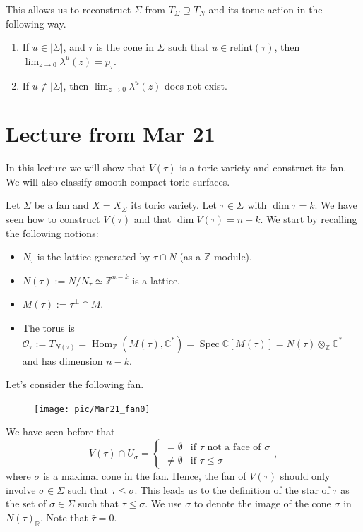 \documentclass[a4paper,12pt]{amsart}
\newcommand{\ZZ}{\mathbb{Z}}
\newcommand{\RR}{\mathbb{R}}
\newcommand{\CC}{\mathbb{C}}
\newcommand{\OO}{\ensuremath{\mathcal{O}}}
\DeclareMathOperator{\Hom}{Hom}
\DeclareMathOperator{\Spec}{Spec}
\begin{document}
This allows us to reconstruct $\Sigma$ from $T_\Sigma\supseteq T_N$ and its toruc action in the following way.
\begin{enumerate}[(1)]
	\item If $u\in|\Sigma|$, and $\tau$ is the cone in $\Sigma$ such that $u\in\text{relint}(\tau)$, then $\lim_{z\rightarrow0}\lambda^u(z)=p_\tau$.
	\item If $u\not\in|\Sigma|$, then $\lim_{z\rightarrow0}\lambda^u(z)$ does not exist.
\end{enumerate}

\newpage
\section{Lecture from Mar 21}

In this lecture we will show that $V(\tau)$ is a toric variety and construct its fan. We will also classify smooth compact toric surfaces.

Let $\Sigma$ be a fan and $X=X_\Sigma$ its toric variety. Let $\tau\in\Sigma$ with $\dim\tau=k$. We have seen how to construct $V(\tau)$ and that $\dim V(\tau)=n-k$. We start by recalling the following notions:
\begin{itemize}
	\item $N_\tau$ is the lattice generated by $\tau\cap N$ (as a $\ZZ$-module).
	\item $N(\tau):=N/N_\tau\simeq\ZZ^{n-k}$ is a lattice.
	\item $M(\tau):=\tau^\perp\cap M$.
	\item The torus is $\OO_\tau:=T_{N(\tau)}=\Hom_\ZZ(M(\tau),\CC^*)=\Spec\CC[M(\tau)]=N(\tau)\otimes_\ZZ\CC^*$ and has dimension $n-k$.
\end{itemize}

\begin{example}
	Let's consider the following fan.
	
	\begin{figure}[h]
		\centering
		\texttt{[image: pic/Mar21\_fan0]}
	\end{figure}
	
	We have seen before that
	$$V(\tau)\cap U_\sigma=\begin{cases}
	=\emptyset&\text{if }\tau\text{ not a face of }\sigma\\
	\not=\emptyset &\text{if }\tau\leq\sigma
	\end{cases},$$
	where $\sigma$ is a maximal cone in the fan. Hence, the fan of $V(\tau)$ should only involve $\sigma\in\Sigma$ such that $\tau\leq\sigma$. This leads us to the definition of the star of $\tau$ as the set of $\sigma\in\Sigma$ such that $\tau\leq\sigma$. We use $\bar{\sigma}$ to denote the image of the cone $\sigma$ in $N(\tau)_\RR$. Note that $\bar{\tau}=0$.
\end{example}
\end{document}
